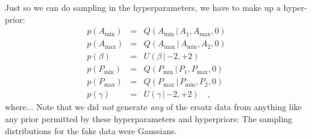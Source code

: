 \documentclass[12pt]{article}
\newcommand{\given}{\,|\,}
\newcommand{\pdf}{p}
\newcommand{\amp}{A}
\newcommand{\period}{P}
\newcommand{\ampmin}{\amp_{\min}}
\newcommand{\ampmax}{\amp_{\max}}
\newcommand{\amppower}{\beta}
\newcommand{\periodmin}{\period_{\min}}
\newcommand{\periodmax}{\period_{\max}}
\newcommand{\periodpower}{\gamma}
\newcommand{\powerlaw}{Q}
\newcommand{\uniform}{U}
\begin{document}
Just so we can do sampling in the hyperparameters, we have to make up
a hyper-prior:
\begin{eqnarray}
\pdf(\ampmin)
  &=&
\powerlaw(\ampmin\given\amp_1,\ampmax,0)
\\
\pdf(\ampmax)
  &=&
\powerlaw(\ampmax\given\ampmin,\amp_2,0)
\\
\pdf(\amppower)
  &=&
\uniform(\amppower\given {-2},{+2})
\\
\pdf(\periodmin)
  &=&
\powerlaw(\periodmin\given\period_1,\periodmax,0)
\\
\pdf(\periodmax)
  &=&
\powerlaw(\periodmax\given\periodmin,\period_2,0)
\\
\pdf(\periodpower)
  &=&
\uniform(\periodpower\given {-2},{+2})
\quad,
\end{eqnarray}
where...  Note that we did \emph{not} generate \emph{any} of the
ersatz data from anything like any prior permitted by these
hyperparameters and hyperpriors: The sampling distributions for the
fake data were Gaussians.
\end{document}
